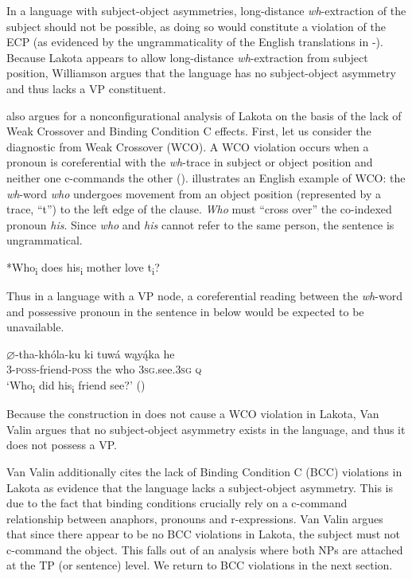 \documentclass[output=paper]{LSP/langsci}
\begin{document}
In a language with subject-object asymmetries, long-distance \textit{wh}-extraction of the subject should not be possible, as doing so would constitute a violation of the ECP (as evidenced by the ungrammaticality of the English translations in -).  Because Lakota appears to allow long-distance \textit{wh}-extraction from subject position, Williamson argues that the language has no subject-object asymmetry and thus lacks a VP constituent.

\citet{VanValin1985,VanValin1987} also argues for a nonconfigurational analysis of Lakota on the basis of the lack of Weak Crossover and Binding Condition C effects.  First, let us consider the diagnostic from Weak Crossover (WCO). A WCO violation occurs when a pronoun is coreferential with the \textit{wh}-trace in subject or object position and neither one c-commands the other (\citealt{Sportiche1985}).   illustrates an English example of WCO: the \textit{wh}-word \textit{who} undergoes movement from an object position (represented by a trace, ``t'') to the left edge of the clause. \textit{Who} must ``cross over'' the co-indexed pronoun \textit{his}. Since \textit{who} and \textit{his} cannot refer to the same person, the sentence is ungrammatical. 

\begin{exe}
\ex\label{ex:jrs:9}  *Who\textsubscript{i} does his\textsubscript{i} mother love t\textsubscript{i}?
\end{exe}

Thus in a language with a VP node, a coreferential reading between the \textit{wh}-word and possessive pronoun in the sentence in  below would be expected to be unavailable.

\begin{exe}
\ex\label{ex:jrs:10} \gll $\varnothing$-tha-kh\'ola-ku 	ki	tuw\'a	wąy\k{\'a}ka	he \\
3-\textsc{poss}-friend-\textsc{poss} the who		\textsc{3sg}.see.\textsc{3sg} 	\textsc{q} \\
\trans `Who\textsubscript{i} did his\textsubscript{i}  friend see?' (\citealt[379]{VanValin1987})
\end{exe}

Because the construction in  does not cause a WCO violation in Lakota, Van Valin argues that no subject-object asymmetry exists in the language, and thus it does not possess a VP.
	
Van Valin additionally cites the lack of Binding Condition C (BCC) violations in Lakota as evidence that the language lacks a subject-object asymmetry.  This is due to the fact that binding conditions crucially rely on a c-command relationship between anaphors, pronouns and r-expressions.  Van Valin argues that since there appear to be no BCC violations in Lakota, the subject must not c-command the object. This falls out of an analysis where both NPs are attached at the TP (or sentence) level. We return to BCC violations in the next section.
\end{document}
